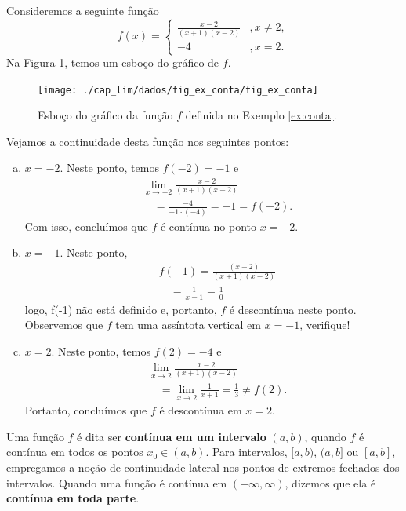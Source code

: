 \begin{ex}\label{ex:conta}
  Consideremos a seguinte função
  \begin{equation}
    f(x) = \left\{
      \begin{array}{ll}
        \frac{x-2}{(x+1)(x-2)} &, x\neq 2,\\
        -4 &, x=2.
      \end{array}
\right.
\end{equation}
Na Figura \ref{fig:ex_conta}, temos um esboço do gráfico de $f$.

\begin{figure}[H]
  \centering
  \texttt{[image: ./cap\_lim/dados/fig\_ex\_conta/fig\_ex\_conta]}
  \caption{Esboço do gráfico da função $f$ definida no Exemplo \ref{ex:conta}.}
  \label{fig:ex_conta}
\end{figure}

Vejamos a continuidade desta função nos seguintes pontos:
\begin{enumerate}[a)]
\item $x=-2$. Neste ponto, temos $f(-2) = -1$ e
  \begin{align}
    & \lim_{x\to -2} \frac{x-2}{(x+1)(x-2)} \\
    & \text{}\quad = \frac{-4}{-1\cdot(-4)} = -1 = f(-2).
  \end{align}
  Com isso, concluímos que $f$ é contínua no ponto $x=-2$.
\item $x=-1$. Neste ponto,
  \begin{align}
    & f(-1) = \frac{(x-2)}{(x+1)(x-2)} \\
    & \text{}\quad = \frac{1}{x-1} = \frac{1}{0}
  \end{align}
  logo, f(-1) não está definido e, portanto, $f$ é descontínua neste ponto. Observemos que $f$ tem uma assíntota vertical em $x=-1$, verifique!
\item $x=2$. Neste ponto, temos $f(2)=-4$ e
  \begin{align}
    & \lim_{x\to 2} \frac{x-2}{(x+1)(x-2)} \\
    & \text{}\quad = \lim_{x\to 2} \frac{1}{x+1} = \frac{1}{3} \neq f(2).
  \end{align}
  Portanto, concluímos que $f$ é descontínua em $x=2$.
\end{enumerate}
\end{ex}

Uma função $f$ é dita ser {\bf contínua em um intervalo} $(a, b)$, quando $f$ é contínua em todos os pontos $x_0\in (a, b)$. Para intervalos, $[a, b)$, $(a, b]$ ou $[a, b]$, empregamos a noção de continuidade lateral nos pontos de extremos fechados dos intervalos. Quando uma função é contínua em $(-\infty, \infty)$, dizemos que ela é {\bf contínua em toda parte}.

